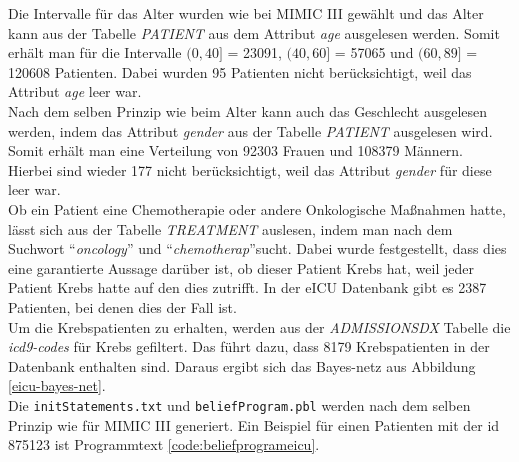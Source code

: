 \documentclass[german,version-2020-11]{uzl-thesis}
\begin{document}
Die Intervalle für das Alter wurden wie bei MIMIC III gewählt und das Alter kann aus der Tabelle \textit{PATIENT} aus dem Attribut \textit{age} ausgelesen werden. Somit erhält man für die Intervalle  $(0,40]$ = 23091,  $(40,60]$ = 57065 und $(60,89]$ = 120608 Patienten. Dabei wurden 95 Patienten nicht berücksichtigt, weil das Attribut \textit{age} leer war.\\ 
Nach dem selben Prinzip wie beim Alter kann auch das Geschlecht ausgelesen werden, indem das Attribut \textit{gender} aus der Tabelle \textit{PATIENT} ausgelesen wird. Somit erhält man eine Verteilung von 92303 Frauen und 108379 Männern. Hierbei sind wieder 177 nicht berücksichtigt, weil das Attribut \textit{gender} für diese leer war. \\
Ob ein Patient eine Chemotherapie oder andere Onkologische Maßnahmen hatte, lässt sich aus der Tabelle \textit{TREATMENT } auslesen, indem man nach dem Suchwort \enquote{\textit{oncology}} und  \enquote{\textit{chemotherap}}sucht. Dabei wurde festgestellt, dass dies eine garantierte Aussage darüber ist, ob dieser Patient Krebs hat, weil jeder Patient Krebs hatte auf den dies zutrifft. In der eICU Datenbank gibt es 2387 Patienten, bei denen dies der Fall ist. \\ 
Um die  Krebspatienten zu erhalten, werden aus der \textit{ADMISSIONSDX} Tabelle die \textit{icd9-codes} für Krebs gefiltert. Das führt dazu, dass 8179 Krebspatienten in der Datenbank enthalten sind. 
Daraus ergibt sich das Bayes-netz aus Abbildung \ref{eicu-bayes-net}. \\ 
Die \texttt{initStatements.txt} und \texttt{beliefProgram.pbl} werden nach dem selben Prinzip wie für MIMIC III generiert. Ein Beispiel für einen Patienten mit der id 875123 ist Programmtext \ref{code:beliefprogrameicu}.
\end{document}
